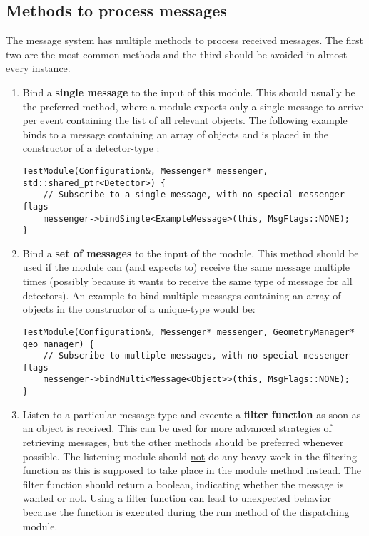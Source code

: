 \subsection{Methods to process messages}
The message system has multiple methods to process received messages.
The first two are the most common methods and the third should be avoided in almost every instance.
\begin{enumerate}
\item Bind a \textbf{single message} to the input of this module.
This should usually be the preferred method, where a module expects only a single message to arrive per event containing the list of all relevant objects.
The following example binds to a message containing an array of objects and is placed in the constructor of a detector-type :
\begin{verbatim}
TestModule(Configuration&, Messenger* messenger, std::shared_ptr<Detector>) {
    // Subscribe to a single message, with no special messenger flags
    messenger->bindSingle<ExampleMessage>(this, MsgFlags::NONE);
}
\end{verbatim}
\item Bind a \textbf{set of messages} to the input of the module.
This method should be used if the module can (and expects to) receive the same message multiple times (possibly because it wants to receive the same type of message for all detectors).
An example to bind multiple messages containing an array of objects in the constructor of a unique-type  would be:
\begin{verbatim}
TestModule(Configuration&, Messenger* messenger, GeometryManager* geo_manager) {
    // Subscribe to multiple messages, with no special messenger flags
    messenger->bindMulti<Message<Object>>(this, MsgFlags::NONE);
}
\end{verbatim}
\item Listen to a particular message type and execute a \textbf{filter function} as soon as an object is received.
This can be used for more advanced strategies of retrieving messages, but the other methods should be preferred whenever possible.
The listening module should \underline{not} do any heavy work in the filtering function as this is supposed to take place in the module  method instead.
The filter function should return a boolean, indicating whether the message is wanted or not.
Using a filter function can lead to unexpected behavior because the function is executed during the run method of the dispatching module.

\end{enumerate}
